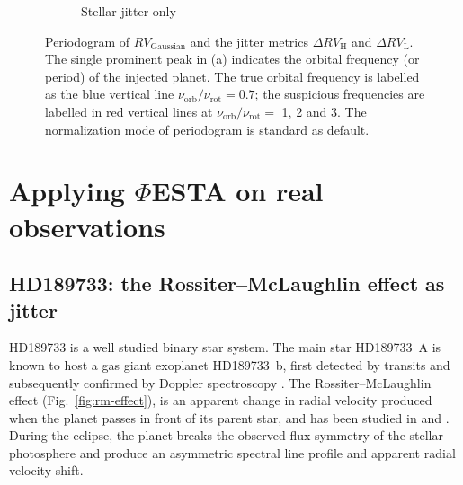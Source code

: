 \begin{figure}[tbp]
\begin{subfigure}[b]{0.49\textwidth}
        \caption{Stellar jitter only}
        \label{fig:Periodogram2}
    \end{subfigure}	
    \caption[Periodogram combined with $\mathit{\Phi}$ESTA]
    {Periodogram of $RV_\text{Gaussian}$ and the jitter metrics $\Delta RV_\text{H}$ and $\Delta RV_\text{L}$. The single prominent peak in (a) indicates the orbital frequency (or period) of the injected planet. The true orbital frequency is labelled as the blue vertical line $\nu_\text{orb}/\nu_\text{rot} = 0.7$; the suspicious frequencies are labelled in red vertical lines at $\nu_\text{orb}/\nu_\text{rot} =$ 1, 2 and 3. The normalization mode of periodogram is standard as default.}
\label{fig:Periodogram}
\end{figure}    



\pagebreak
\section{Applying $\mathit{\Phi}$ESTA on real observations}
\label{\thesection}
\label{sec:observation}

\subsection{HD189733: the Rossiter–McLaughlin effect as jitter}
\label{sec:HD189733}

HD189733 is a well studied binary star system. The main star HD189733~A is known to host a gas giant exoplanet HD189733~b, first detected by transits and subsequently confirmed by Doppler spectroscopy \cite{Bouchy2005ELODIE}. The Rossiter–McLaughlin effect (Fig.~\ref{fig:rm-effect}), is an apparent change in radial velocity produced when the planet passes in front of its parent star, and has been studied in \cite{Cochran2006} and \cite{Triaud2009}. During the eclipse, the planet breaks the observed flux symmetry of the stellar photosphere and produce an asymmetric spectral line profile and apparent radial velocity shift.

